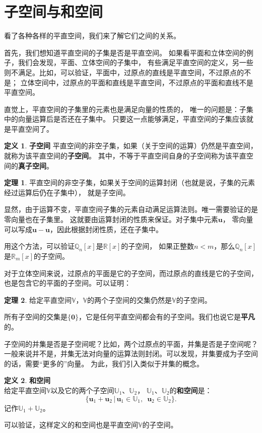 \documentclass[12pt,UTF8]{ctexbook}
\theoremstyle{definition}
\newtheorem{df}{定义}[section]
\newtheorem{tm}{定理}[section]
\theoremstyle{plain}
\begin{document}
\section{子空间与和空间}
看了各种各样的平直空间，我们来了解它们之间的关系。

首先，我们想知道平直空间的子集是否是平直空间。
如果看平面和立体空间的例子，我们会发现，平面、立体空间的子集中，
有些满足平直空间的定义，另一些则不满足。比如，可以验证，平面中，过原点的直线是平直空间，不过原点的不是；
立体空间中，过原点的平面和直线是平直空间，不过原点的平面和直线不是平直空间。

直觉上，平直空间的子集里的元素也是满足向量的性质的，
唯一的问题是：子集中的向量运算后是否还在子集中。
只要这一点能够满足，平直空间的子集应该就是平直空间了。

\begin{df}{\textbf{子空间}}
    平直空间的非空子集，如果（关于空间的运算）仍然是平直空间，就称为该平直空间的\textbf{子空间}。
    其中，不等于平直空间自身的子空间称为该平直空间的\textbf{真子空间}。
\end{df}

\begin{tm}
    平直空间的非空子集，如果关于空间的运算封闭（也就是说，子集的元素经过运算后仍在子集中），
    就是子空间。
\end{tm}

显然，由于运算不变，平直空间子集的元素自动满足运算法则。唯一需要验证的是零向量也在子集里。
这就要由运算封闭的性质来保证。对子集中元素$\mathbf{u}$，
零向量可以写成$\mathbf{u} - \mathbf{u}$，因此根据封闭性质，还在子集中。

用这个方法，可以验证$\mathbb{Q}_n[x]$是$\mathbb{R}[x]$的子空间，
如果正整数$n<m$，那么$\mathbb{Q}_n[x]$是$\mathbb{R}_m[x]$的子空间。

对于立体空间来说，过原点的平面是它的子空间，而过原点的直线是它的子空间，
也是包含它的平面的子空间。可以证明：

\begin{tm}
    给定平直空间$\mathbb{V}$，$\mathbb{V}$的两个子空间的交集仍然是$\mathbb{V}$的子空间。
\end{tm}

所有子空间的交集是$\{\mathbf{0}\}$，它是任何平直空间都会有的子空间。我们也说它是\textbf{平凡}的。

子空间的并集是否是子空间呢？比如，两个过原点的平面，并集是否是子空间呢？
一般来说并不是，并集无法对向量的运算法则封闭。可以发现，并集要成为子空间的话，需要“更多的”向量。
为此，我们引入类似于并集的概念。

\begin{df}{\textbf{和空间}}
    \mbox{} \\
    给定平直空间$\mathbb{V}$以及它的两个子空间$\mathbb{U}_1$、$\mathbb{U}_2$，
    $\mathbb{U}_1$、$\mathbb{U}_2$的\textbf{和空间}是：
    $$ \{ \mathbf{u}_1 + \mathbf{u}_2\,|\, \mathbf{u}_1 \in \mathbb{U}_1,\,\,\, \mathbf{u}_2 \in \mathbb{U}_2\}.$$
    记作$\mathbb{U}_1 + \mathbb{U}_2$。
\end{df}
可以验证，这样定义的和空间也是平直空间$\mathbb{V}$的子空间。
\end{document}

